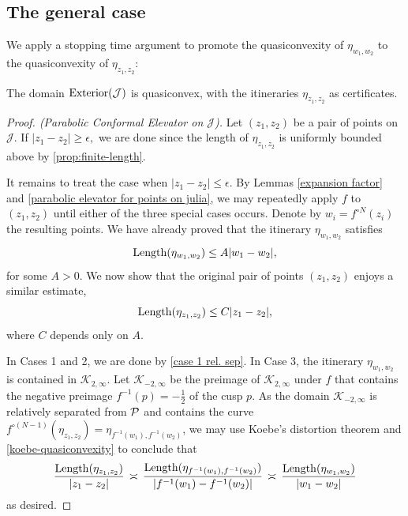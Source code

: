 \subsection{The general case}
We apply a stopping time argument to promote the quasiconvexity of $\eta_{w_1,w_2}$ to the quasiconvexity of $\eta_{z_1,z_2}$: 

\begin{theorem} \label{quasiconvex-Cauliflower}
	The domain $\operatorname{Exterior}(\mathcal{J})$ is quasiconvex, with the itineraries $\eta_{z_1,z_2}$ as certificates.
\end{theorem}

\begin{proof}[Proof. (Parabolic Conformal Elevator on $\mathcal J$)] \label{parabolic-elevator}
Let  $(z_1,z_2)$ be a pair of points on $\mathcal J$. 
If $|z_{1}-z_{2}| \geq \epsilon,$ 
we are done since the length of $\eta_{z_1,z_2}$ is uniformly bounded above by  \cref{prop:finite-length}.

It remains to treat the case when $|z_{1}-z_{2}| \le \epsilon$. By Lemmas \ref{expansion factor} and \ref{parabolic elevator for points on julia}, we may repeatedly apply $f$ to $(z_1, z_2)$ until either of the three special cases occurs.
Denote by $w_i=f^{\circ N}(z_i)$ the resulting points. We have already proved that the itinerary $\eta_{w_1,w_2}$ satisfies
\begin{equation*}
	\operatorname{Length}(\eta_{w_1,w_2}) \leq A |w_1-w_2|,
\end{equation*}
for some $A>0$. We now show that the original pair of points $(z_1,z_2)$ enjoys a similar estimate,
\begin{equation*}
	\operatorname{Length}(\eta_{z_1,z_2}) \leq C |z_1-z_2|,
\end{equation*}
where $C$ depends only on $A$.

In Cases 1 and 2, we are done by \cref{case 1 rel. sep}. In Case 3, 
the itinerary $\eta_{w_1,w_2}$ is contained in $\mathcal K_{2,\infty}$. Let $\mathcal K_{-2,\infty}$ be the preimage of $\mathcal K_{2,\infty}$ under $f$ that contains the negative preimage $f^{-1}(p)=-\tfrac 12$ of the cusp $p$. 
As the domain $\mathcal K_{-2,\infty}$ is relatively separated from $\operatorname{\mathcal P}$ and contains the curve 
$f^{\circ (N-1)}(\eta_{z_1,z_2}) = \eta_{f^{-1}(w_1),f^{-1}(w_2)}$,
we may use Koebe's distortion theorem and \cref{koebe-quasiconvexity} to conclude that
\begin{equation}
	\frac{\operatorname{Length}(\eta_{z_1,z_2})}{|z_1-z_2|} \, \asymp \,
		\frac{\operatorname{Length}(\eta_{f^{-1}(w_1),f^{-1}(w_2)})}{|f^{-1}(w_1)-f^{-1}(w_2)|} \, \asymp \,
		\frac{\operatorname{Length}(\eta_{w_1,w_2})}{|w_1-w_2|}
\end{equation}
as desired.
\end{proof}


